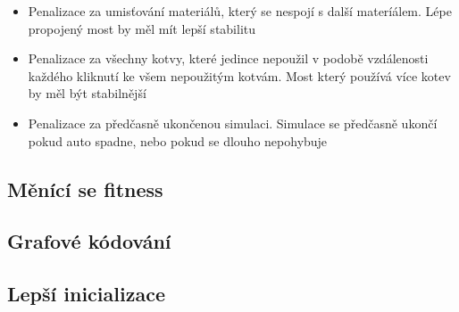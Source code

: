 \begin{itemize}
    \item Penalizace za umisťování materiálů, který se nespojí s další materíálem. Lépe propojený most by měl mít lepší stabilitu
    \item Penalizace za všechny kotvy, které jedince nepoužil v podobě vzdálenosti každého kliknutí ke všem nepoužitým kotvám. Most který používá více kotev by měl být stabilnější
    \item Penalizace za předčasně ukončenou simulaci. Simulace se předčasně ukončí pokud auto spadne, nebo pokud se dlouho nepohybuje
\end{itemize}

\subsection{Měnící se fitness}


\subsection{Grafové kódování}


\subsection{Lepší inicializace}

